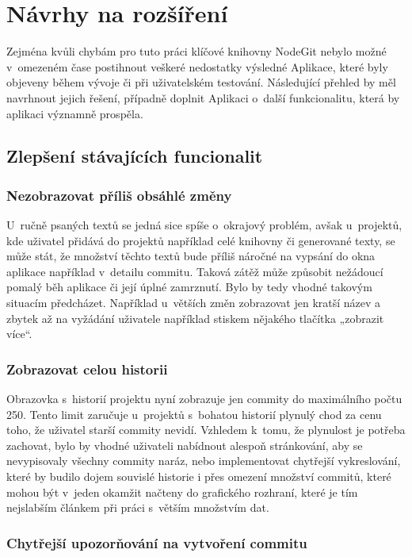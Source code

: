 \chapter{Návrhy na rozšíření}

Zejména kvůli chybám pro tuto práci klíčové knihovny NodeGit nebylo možné v~omezeném čase postihnout veškeré nedostatky výsledné Aplikace, které byly objeveny během vývoje či při uživatelském testování. Následující přehled by měl navrhnout jejich řešení, případně doplnit Aplikaci o~další funkcionalitu, která by aplikaci významně prospěla.


\section{Zlepšení stávajících funcionalit}

\subsection{Nezobrazovat příliš obsáhlé změny}

U~ručně psaných textů se jedná sice spíše o~okrajový problém, avšak u~projektů, kde uživatel přidává do projektů například celé knihovny či generované texty, se může stát, že množství těchto textů bude příliš náročné na vypsání do okna aplikace například v~detailu commitu. Taková zátěž může způsobit nežádoucí pomalý běh aplikace či její úplné zamrznutí. Bylo by tedy vhodné takovým situacím předcházet. Například u~větších změn zobrazovat jen kratší název a zbytek až na vyžádání uživatele například stiskem nějakého tlačítka „zobrazit více“.

\subsection{Zobrazovat celou historii}

Obrazovka s~historií projektu nyní zobrazuje jen commity do maximálního počtu 250. Tento limit zaručuje u~projektů s~bohatou historií plynulý chod za cenu toho, že uživatel starší commity nevidí. Vzhledem k~tomu, že plynulost je potřeba zachovat, bylo by vhodné uživateli nabídnout alespoň stránkování, aby se nevypisovaly všechny commity naráz, nebo implementovat chytřejší vykreslování, které by budilo dojem souvislé historie i přes omezení množství commitů, které mohou být v~jeden okamžit načteny do grafického rozhraní, které je tím nejslabším článkem při práci s~větším množstvím dat.

\subsection{Chytřejší upozorňování na vytvoření commitu}

